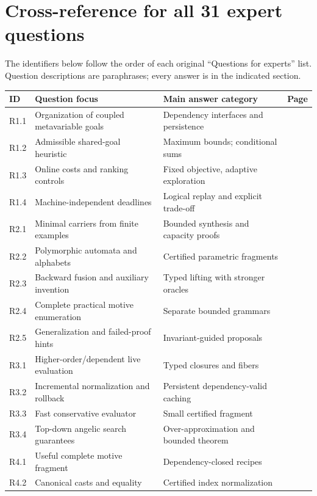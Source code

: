\documentclass[11pt,a4paper]{article}
\theoremstyle{remark}
\begin{document}
\section{Cross-reference for all 31 expert questions}\label{app:crossref}
\noindent The identifiers below follow the order of each original ``Questions for experts'' list. Question descriptions are paraphrases; every answer is in the indicated section.
\begin{longtable}{@{}P{14mm}P{76mm}P{46mm}P{10mm}@{}}
\toprule
ID & Question focus & Main answer category & Page\\
\midrule
\endhead
R1.1 & Organization of coupled metavariable goals & Dependency interfaces and persistence & \pageref{q11}\\
R1.2 & Admissible shared-goal heuristic & Maximum bounds; conditional sums & \pageref{q12}\\
R1.3 & Online costs and ranking controls & Fixed objective, adaptive exploration & \pageref{q13}\\
R1.4 & Machine-independent deadlines & Logical replay and explicit trade-off & \pageref{q14}\\
R2.1 & Minimal carriers from finite examples & Bounded synthesis and capacity proofs & \pageref{q21}\\
R2.2 & Polymorphic automata and alphabets & Certified parametric fragments & \pageref{q22}\\
R2.3 & Backward fusion and auxiliary invention & Typed lifting with stronger oracles & \pageref{q23}\\
R2.4 & Complete practical motive enumeration & Separate bounded grammars & \pageref{q24}\\
R2.5 & Generalization and failed-proof hints & Invariant-guided proposals & \pageref{q25}\\
R3.1 & Higher-order/dependent live evaluation & Typed closures and fibers & \pageref{q31}\\
R3.2 & Incremental normalization and rollback & Persistent dependency-valid caching & \pageref{q32}\\
R3.3 & Fast conservative evaluator & Small certified fragment & \pageref{q33}\\
R3.4 & Top-down angelic search guarantees & Over-approximation and bounded theorem & \pageref{q34}\\
R4.1 & Useful complete motive fragment & Dependency-closed recipes & \pageref{q41}\\
R4.2 & Canonical casts and equality & Certified index normalization & \pageref{q42}\\

\end{longtable}
\end{document}
